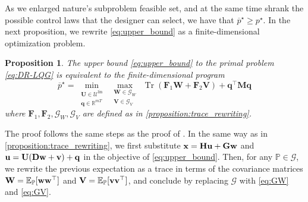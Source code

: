 \documentclass[letterpaper, 10 pt, conference]{ieeeconf}  %
\makeatletter
\renewenvironment{proof}[1][\proofname]{\par
  \pushQED{\qed}%
  \normalfont \topsep\z@
  \trivlist
  \item[\hskip2em
        \itshape
    #1\@addpunct{:}]\ignorespaces
}{%
  \popQED\endtrivlist\@endpefalse
}
\theoremstyle{ieeeconf}
\newtheorem{proposition}{Proposition}
\DeclareMathOperator{\Tr}{Tr}
\newcommand{\R}{\mathbb{R}}
\newcommand{\Prob}{\mathbb{P}}
\newcommand{\E}{\mathbb{E}}
\makeatother
\begin{document}
As we enlarged nature's subproblem feasible set, and at the same time shrank the possible control
laws that the designer can select, we have that $\overline{p}^\star \geq p^\star$. In the next proposition, we rewrite \eqref{eq:upper_bound} as a finite-dimensional optimization problem.
\begin{proposition}
    The upper bound \eqref{eq:upper_bound} to the primal problem \eqref{eq:DR-LQG} is equivalent to the finite-dimensional program
    \begin{equation}
    \label{eq:trace_upperbound}
    \overline{p}^\star = \min _{\substack{\mathbf{U}\in\mathcal{U}^{\text{lin}}\\ \mathbf{q}\in\R^{mT}}}\ \max _{\substack{\mathbf{W}\in\mathcal{G}_W\\ \mathbf{V}\in\mathcal{G}_V}}\ \Tr\left(\mathbf{F}_{1} \mathbf{W}+\mathbf{F}_{2} \mathbf{V}\right)+\mathbf{q}^{\top} \mathbf{M} \mathbf{q}
    \end{equation}
where $\mathbf{F}_1, \mathbf{F}_2, \mathcal{G}_W, \mathcal{G}_V$ are defined as in \cref{proposition:trace_rewriting}.
\end{proposition}
\begin{proof}
The proof follows the same steps as the proof of \cite[Proposition 3.4]{taskesen2023distributionally}. In the same way as in \cref{proposition:trace_rewriting}, we first substitute $\bf {x = H u + G w}$ and $\bf {u = U(Dw + v) + q}$ in the objective of \eqref{eq:upper_bound}. Then, for any $\Prob\in\mathcal{G}$, we rewrite the previous expectation as a trace in terms of the covariance matrices $\mathbf{W} = \E_\Prob[\bf ww^\top]$ and $\mathbf{V} = \E_\Prob[\bf vv^\top]$, and conclude by replacing $\mathcal{G}$ with \eqref{eq:GW} and \eqref{eq:GV}.
\end{proof}
\end{document}
